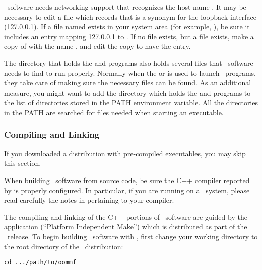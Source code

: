 \OOMMF\ software needs networking support that recognizes
the host name .  It may be necessary
to edit a file which records that  is a synonym
for the loopback interface (127.0.0.1).  If a file named 
exists in your system area (for example, ),
be sure it includes an entry mapping 127.0.0.1 to .
If no  file exists, but a  file exists,
make a copy of  with the name , and edit
the copy to have the  entry.

The directory that holds the  and  programs also
holds several {} files that \OOMMF\ software needs to find to
run properly.  Normally when the  or
 is
used to launch \OOMMF\ programs, they take care of making sure the
necessary {} files can be found.  As an additional measure,
you might want to add the directory which holds the  and
 programs to the list of directories stored in the
PATH environment variable.  All the
directories in the PATH are searched for {} files needed when
starting an executable.  

\subsubsection{Compiling and Linking}\label{sec:install.compile}

If you downloaded a distribution with pre-compiled executables, you may
skip this section.

When building \OOMMF\ software from source code, be sure the C++
compiler reported by  is properly configured.
In particular, if you are running on a \Windows\ system, please read
carefully the notes in 
  pertaining to your
compiler.

The compiling and linking of the C++ portions of \OOMMF\ software 
are guided by the application
(``Platform Independent Make'') which 
is distributed as part of the \OOMMF\ release.
To begin building \OOMMF\ software with , first change
your working directory
to the root directory of the \OOMMF\ distribution:
\begin{verbatim}
cd .../path/to/oommf
\end{verbatim}

